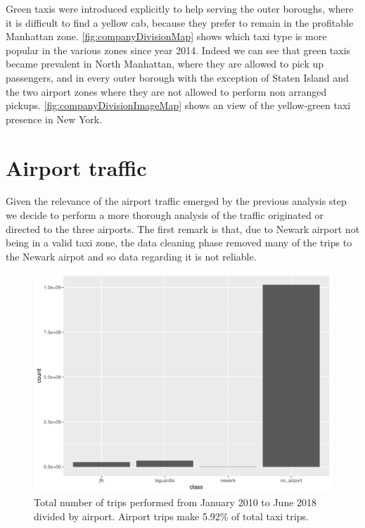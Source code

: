 \documentclass{acm_proc_article-sp-sigmod09}
\begin{document}
Green taxis were introduced explicitly to help serving the outer boroughs, where it is difficult to find a yellow cab, because they prefer to remain in the profitable Manhattan zone. \cref{fig:companyDivisionMap} shows which taxi type is more popular in the various zones since year 2014. Indeed we can see that green taxis became prevalent in North Manhattan, where they are allowed to pick up passengers, and in every outer borough with the exception of Staten Island and the two airport zones where they are not allowed to perform non arranged pickups. \cref{fig:companyDivisionImageMap} shows an  view of the yellow-green taxi presence in New York.

\section{Airport traffic}

Given the relevance of the airport traffic emerged by the previous analysis step we decide to perform a more thorough analysis of the traffic originated or directed to the three airports. The first remark is that, due to Newark airport not being in a valid taxi zone, the data cleaning phase removed many of the trips to the Newark airpot and so data regarding it is not reliable.

\begin{figure}
	\centering
	\includegraphics[width=1\columnwidth]{resources/airport/airport_distr.pdf}
	\caption{Total number of trips performed from January 2010 to June 2018 divided by airport. Airport trips make 5.92\% of total taxi trips.}
	\label{fig:airportDistr}
\end{figure}
\end{document}
